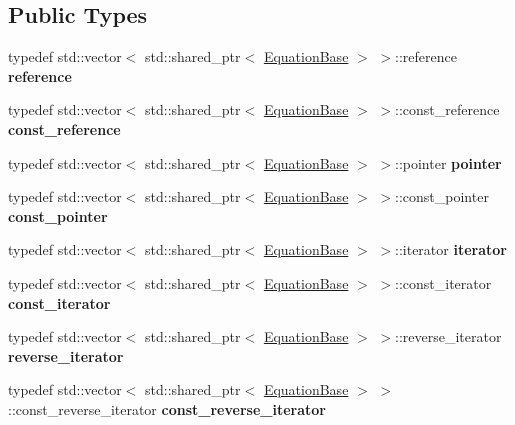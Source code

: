 \subsection*{Public Types}
\begin{DoxyCompactItemize}
\item 
\mbox{\label{classradix_1_1Equation_af14b805e134e0b97985269ded61a0ff3}} 
typedef std\+::vector$<$ std\+::shared\+\_\+ptr$<$ \hyperlink{classradix_1_1EquationBase}{Equation\+Base} $>$ $>$\+::reference {\bfseries reference}
\item 
\mbox{\label{classradix_1_1Equation_a27b9024e87f9fc6fdc69d9acfb169c13}} 
typedef std\+::vector$<$ std\+::shared\+\_\+ptr$<$ \hyperlink{classradix_1_1EquationBase}{Equation\+Base} $>$ $>$\+::const\+\_\+reference {\bfseries const\+\_\+reference}
\item 
\mbox{\label{classradix_1_1Equation_acbf3eb05aca712c25798ee3906167649}} 
typedef std\+::vector$<$ std\+::shared\+\_\+ptr$<$ \hyperlink{classradix_1_1EquationBase}{Equation\+Base} $>$ $>$\+::pointer {\bfseries pointer}
\item 
\mbox{\label{classradix_1_1Equation_aa6ad9cd7762a256ffcbfb666dd81b869}} 
typedef std\+::vector$<$ std\+::shared\+\_\+ptr$<$ \hyperlink{classradix_1_1EquationBase}{Equation\+Base} $>$ $>$\+::const\+\_\+pointer {\bfseries const\+\_\+pointer}
\item 
\mbox{\label{classradix_1_1Equation_a3010f04d61440cb48f96fa8a04847f77}} 
typedef std\+::vector$<$ std\+::shared\+\_\+ptr$<$ \hyperlink{classradix_1_1EquationBase}{Equation\+Base} $>$ $>$\+::iterator {\bfseries iterator}
\item 
\mbox{\label{classradix_1_1Equation_ad5b7cb4508fc13c9a9a9e019a5f883b5}} 
typedef std\+::vector$<$ std\+::shared\+\_\+ptr$<$ \hyperlink{classradix_1_1EquationBase}{Equation\+Base} $>$ $>$\+::const\+\_\+iterator {\bfseries const\+\_\+iterator}
\item 
\mbox{\label{classradix_1_1Equation_aafcd464f7492c0f0483b1c2e66893138}} 
typedef std\+::vector$<$ std\+::shared\+\_\+ptr$<$ \hyperlink{classradix_1_1EquationBase}{Equation\+Base} $>$ $>$\+::reverse\+\_\+iterator {\bfseries reverse\+\_\+iterator}
\item 
\mbox{\label{classradix_1_1Equation_a3641db32538ca872e1cd874d533dcbdd}} 
typedef std\+::vector$<$ std\+::shared\+\_\+ptr$<$ \hyperlink{classradix_1_1EquationBase}{Equation\+Base} $>$ $>$\+::const\+\_\+reverse\+\_\+iterator {\bfseries const\+\_\+reverse\+\_\+iterator}
\end{DoxyCompactItemize}
